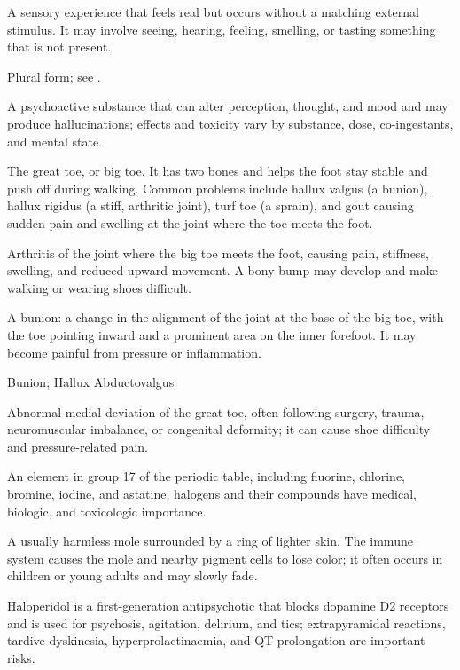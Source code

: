  A sensory experience that feels real but occurs without a matching external stimulus. It may involve seeing, hearing, feeling, smelling, or tasting something that is not present.

 Plural form; see .

 A psychoactive substance that can alter perception, thought, and mood and may produce hallucinations; effects and toxicity vary by substance, dose, co-ingestants, and mental state.

 The great toe, or big toe. It has two bones and helps the foot stay stable and push off during walking. Common problems include hallux valgus (a bunion), hallux rigidus (a stiff, arthritic joint), turf toe (a sprain), and gout causing sudden pain and swelling at the joint where the toe meets the foot.

 Arthritis of the joint where the big toe meets the foot, causing pain, stiffness, swelling, and reduced upward movement. A bony bump may develop and make walking or wearing shoes difficult.

 A bunion: a change in the alignment of the joint at the base of the big toe, with the toe pointing inward and a prominent area on the inner forefoot. It may become painful from pressure or inflammation.

\synonyms
Bunion; Hallux Abductovalgus

 Abnormal medial deviation of the great toe, often following surgery, trauma, neuromuscular imbalance, or congenital deformity; it can cause shoe difficulty and pressure-related pain.

 An element in group 17 of the periodic table, including fluorine, chlorine, bromine, iodine, and astatine; halogens and their compounds have medical, biologic, and toxicologic importance.

 A usually harmless mole surrounded by a ring of lighter skin. The immune system causes the mole and nearby pigment cells to lose color; it often occurs in children or young adults and may slowly fade.

 Haloperidol is a first-generation antipsychotic that blocks dopamine D2 receptors and is used for psychosis, agitation, delirium, and tics; extrapyramidal reactions, tardive dyskinesia, hyperprolactinaemia, and QT prolongation are important risks.

